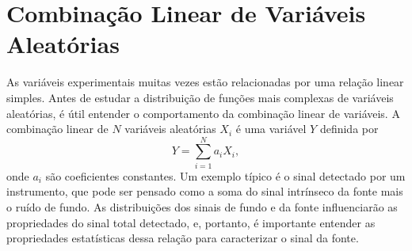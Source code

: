 \section{Combinação Linear de Variáveis Aleatórias}

As variáveis experimentais muitas vezes estão relacionadas por uma relação linear simples. Antes de estudar a distribuição de funções mais complexas de variáveis aleatórias, é útil entender o comportamento da combinação linear de variáveis. A combinação linear de $N$ variáveis aleatórias $X_i$ é uma variável $Y$ definida por
\begin{equation}
 Y = \sum_{i=1}^{N} a_i X_i,
\end{equation}
onde $a_i$ são coeficientes constantes. Um exemplo típico é o sinal detectado por um instrumento, que pode ser pensado como a soma do sinal intrínseco da fonte mais o ruído de fundo. As distribuições dos sinais de fundo e da fonte influenciarão as propriedades do sinal total detectado, e, portanto, é importante entender as propriedades estatísticas dessa relação para caracterizar o sinal da fonte.

